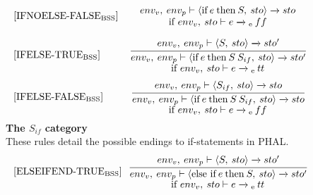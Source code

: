 \begin{equation}\label{typerules:listing:ifnoelse-false}
\begin{minipage}{.2\linewidth}
$[\text{IFNOELSE-FALSE}_\text{BSS}]$
\end{minipage}
\begin{minipage}{.8\linewidth}
\centering
$env_v, \: env_p \vdash \langle \text{if} \: e \: \text{then} \: S, \: sto \rangle \xrightarrow{} sto$ 
\\
if $env_v, \: sto \vdash e \xrightarrow{}\textsubscript{e} \: ff$
\end{minipage}
\end{equation}

\begin{equation}
\begin{minipage}{.2\linewidth}
$[\text{IFELSE-TRUE}_\text{BSS}]$
\end{minipage}
\begin{minipage}{.8\linewidth}
\centering
$\cfrac{env_v, \: env_p \vdash \langle S, \: sto \rangle \xrightarrow{} sto'}{env_v, \: env_p \vdash \langle \text{if} \: e \: \text{then} \: S \:S_{if}, \: sto \rangle \xrightarrow{} sto'}$ 
\\
if $env_v, \: sto \vdash e \xrightarrow{}\textsubscript{e} \: tt$
\end{minipage}
\end{equation}
\begin{equation}
\begin{minipage}{.2\linewidth}
$[\text{IFELSE-FALSE}_\text{BSS}]$
\end{minipage}
\begin{minipage}{.8\linewidth}
\centering
$\cfrac{env_v, \: env_p \vdash \langle S_{if}, \: sto \rangle \xrightarrow{} sto}{env_v, \: env_p \vdash \langle \text{if} \: e \: \text{then} \: S \: S_{if}, \: sto \rangle \xrightarrow{} sto}$ 
\\
if $env_v, \: sto \vdash e \xrightarrow{}\textsubscript{e} \: ff$
\end{minipage}
\end{equation}
\textbf{The $S_{if}$ category}\\
These rules detail the possible endings to if-statements in PHAL.
\begin{equation}
\begin{minipage}{.2\linewidth}
$[\text{ELSEIFEND-TRUE}_\text{BSS}]$
\end{minipage}
\begin{minipage}{.8\linewidth}
\centering
$\cfrac{env_v, \: env_p \vdash \langle S, \: sto \rangle \xrightarrow{} sto'}{env_v, \: env_p \vdash \langle \text{else if} \: e \: \text{then} \: S, \: sto \rangle \xrightarrow{} sto'}$ 
\\
if $env_v, \: sto \vdash e \xrightarrow{}\textsubscript{e} \: tt$
\end{minipage}
\end{equation}

